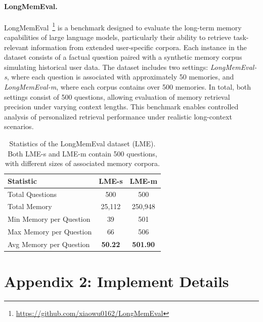 \paragraph{LongMemEval.}
LongMemEval~\cite{wu2025longmemeval}\footnote{\url{https://github.com/xiaowu0162/LongMemEval}} is a benchmark designed to evaluate the long-term memory capabilities of large language models, particularly their ability to retrieve task-relevant information from extended user-specific corpora. Each instance in the dataset consists of a factual question paired with a synthetic memory corpus simulating historical user data. The dataset includes two settings: \textit{LongMemEval-s}, where each question is associated with approximately 50 memories, and \textit{LongMemEval-m}, where each corpus contains over 500 memories. In total, both settings consist of 500 questions, allowing evaluation of memory retrieval precision under varying context lengths. This benchmark enables controlled analysis of personalized retrieval performance under realistic long-context scenarios.

\begin{table}[htbp]
\centering
\begin{tabular}{lcc}
\toprule
\textbf{Statistic} & \textbf{LME-s} & \textbf{LME-m} \\
\midrule
Total Questions & 500 & 500 \\
Total Memory & 25,112 & 250,948 \\
Min Memory per Question & 39 & 501 \\
Max Memory per Question & 66 & 506 \\
Avg Memory per Question & \textbf{50.22} & \textbf{501.90} \\
\bottomrule
\end{tabular}
\caption{Statistics of the LongMemEval dataset (LME). Both LME-s and LME-m contain 500 questions, with different sizes of associated memory corpora.}
\label{tab:longmemeval_stats_vertical}
\end{table}


\section*{Appendix 2: Implement Details}

